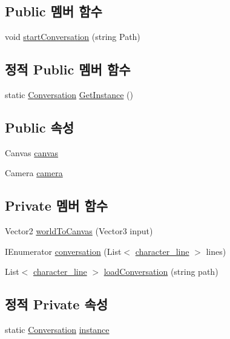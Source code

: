 \subsection*{Public 멤버 함수}
\begin{DoxyCompactItemize}
\item 
void \mbox{\hyperlink{class_conversation_a3822a8973deb8b3bcf00bbca652f5989}{start\+Conversation}} (string Path)
\end{DoxyCompactItemize}
\subsection*{정적 Public 멤버 함수}
\begin{DoxyCompactItemize}
\item 
static \mbox{\hyperlink{class_conversation}{Conversation}} \mbox{\hyperlink{class_conversation_abdff2391f9a6c8a1ec35a0dc074fb48d}{Get\+Instance}} ()
\end{DoxyCompactItemize}
\subsection*{Public 속성}
\begin{DoxyCompactItemize}
\item 
Canvas \mbox{\hyperlink{class_conversation_ae4e6edf2f8277a7d878de37494e4f9ab}{canvas}}
\item 
Camera \mbox{\hyperlink{class_conversation_a922d9a7686e8ffebe30a93e32bffc197}{camera}}
\end{DoxyCompactItemize}
\subsection*{Private 멤버 함수}
\begin{DoxyCompactItemize}
\item 
Vector2 \mbox{\hyperlink{class_conversation_aaf0ecb8e30c248e7f8bf29cc7fe14678}{world\+To\+Canvas}} (Vector3 input)
\item 
I\+Enumerator \mbox{\hyperlink{class_conversation_a11eb2e1944c3a857ac1447288d89fc39}{conversation}} (List$<$ \mbox{\hyperlink{classcharacter__line}{character\+\_\+line}} $>$ lines)
\item 
List$<$ \mbox{\hyperlink{classcharacter__line}{character\+\_\+line}} $>$ \mbox{\hyperlink{class_conversation_a628e4549b4d58692992c6d9026699c5f}{load\+Conversation}} (string path)
\end{DoxyCompactItemize}
\subsection*{정적 Private 속성}
\begin{DoxyCompactItemize}
\item 
static \mbox{\hyperlink{class_conversation}{Conversation}} \mbox{\hyperlink{class_conversation_a4dff96bb1448dc4396b031d8062461a9}{instance}}
\end{DoxyCompactItemize}


